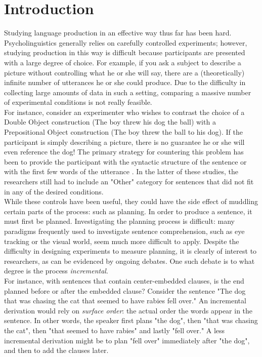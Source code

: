 \section{Introduction}
 Studying language production in an effective way thus far has been hard. Psycholinguistics generally relies on carefully controlled experiments; however, studying production in this way is difficult because participants are presented with a large degree of choice. For example, if you ask a subject to describe a picture without controlling what he or she will say, there are a (theoretically) infinite number of utterances he or she could produce. Due to the difficulty in collecting large amounts of data in such a setting, comparing a massive number of experimental conditions is not really feasible. \\
 \indent For instance, consider an experimenter who wishes to contrast the choice of a Double Object construction (The boy threw his dog the ball) with a Prepositional Object construction (The boy threw the ball to his dog). If the participant is simply describing a picture, there is no guarantee he or she will even reference the dog! The primary strategy for countering this problem has been to provide the participant with the syntactic structure of the sentence \citep{incremental} or with the first few words of the utterance \citep{chinese}. In the latter of these studies, the researchers still had to include an "Other" category for sentences that did not fit in any of the desired conditions. \\
 \indent While these controls have been useful, they could have the side effect of muddling certain parts of the process: such as planning. In order to produce a sentence, it must first be planned. Investigating the planning process is difficult: many paradigms frequently used to investigate sentence comprehension, such as eye tracking or the visual world, seem much more difficult to apply. Despite the difficulty in designing experiments to measure planning, it is clearly of interest to researchers, as can be evidenced by ongoing debates. One such debate is to what degree is the process \emph{incremental}. \\
 \indent For instance, with sentences that contain center-embedded clauses, is the end planned before or after the embedded clause? Consider the sentence "The dog that was chasing the cat that seemed to have rabies fell over." An incremental derivation would rely on \emph{surface order}: the actual order the words appear in the sentence. In other words, the speaker first plans "the dog", then "that was chasing the cat", then "that seemed to have rabies" and lastly "fell over." A less incremental derivation might be to plan "fell over" immediately after "the dog", and then to add the clauses later. \\
